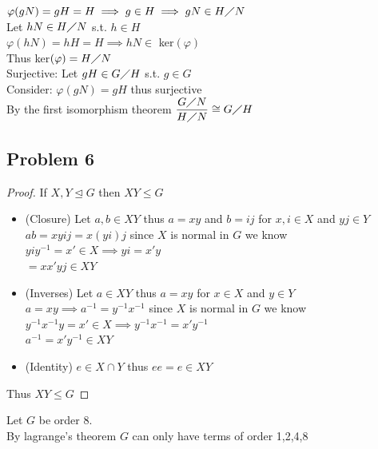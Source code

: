 \documentclass[12pt, letterpaper]{article}
\theoremstyle{definition}
\begin{document}
\begin{enumerate}[(a)]
    $\varphi(gN)=gH=H \implies g \in H \implies gN \in H \diagup N$\\
    Let $hN \in H \diagup N$ s.t. $h \in H$\\
    $\varphi(hN)=hH=H \implies hN \in$ ker$(\varphi)$\\
    Thus ker$(\varphi) = H \diagup N$\\
    Surjective: Let $gH \in G \diagup H$ s.t. $g \in G$\\
    Consider: $\varphi(gN)=gH$ thus surjective\\
    By the first isomorphism theorem $\dfrac{G \diagup N}{H \diagup N} \cong G \diagup H$
\end{enumerate}

\newpage
\subsection*{Problem 6}
\begin{proof}
    If $X,Y \unlhd G$ then $XY \leq G$
    \begin{itemize}
        \item (Closure) Let $a,b \in XY$ thus $a=xy$ and $b=ij$ for $x,i \in X$ and $yj \in Y$\\
        $ab=xyij=x(yi)j$ since $X$ is normal in $G$ we know $yiy^{-1}=x' \in X \implies yi=x'y$\\
        $=xx'yj \in XY$
        \item (Inverses) Let $a \in XY$ thus $a=xy$ for $x \in X$ and $y \in Y$\\
        $a=xy \implies a^{-1}=y^{-1}x^{-1}$ since $X$ is normal in $G$ we know $y^{-1}x^{-1}y=x' \in X \implies y^{-1}x^{-1}=x'y^{-1}$\\
        $a^{-1}=x'y^{-1} \in XY$
        \item (Identity) $e \in X \cap Y$ thus $ee=e\in XY$
    \end{itemize}
    Thus $XY \leq G$
\end{proof}
Let $G$ be order 8.\\
By lagrange's theorem $G$ can only have terms of order 1,2,4,8
\end{document}

